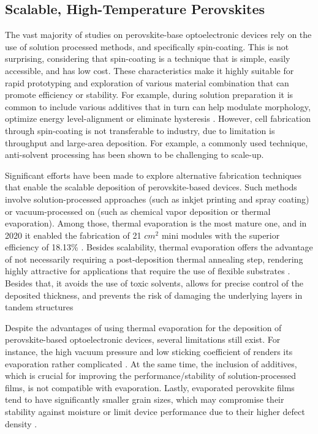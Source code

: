 \subsection{Scalable, High-Temperature Perovskites}

The vast majority of studies on perovskite-base optoelectronic devices rely on the use of solution processed methods, and specifically spin-coating. This is not surprising, considering that spin-coating is a technique that is simple, easily accessible, and has low cost. These characteristics make it highly suitable for rapid prototyping and exploration of various material combination that can promote efficiency or stability. For example, during solution preparation it is common to include various additives that in turn can help modulate morphology, optimize energy level-alignment or eliminate hysteresis \cite{Liu2020ACells}. However, cell fabrication through spin-coating is not transferable to industry, due to limitation is throughput and large-area deposition. For example, a commonly used technique, anti-solvent processing has been shown to be challenging to scale-up\cite{Saki2021Solution-processedCells}.

Significant efforts have been made to explore alternative fabrication techniques that enable the scalable deposition of perovskite-based devices. Such methods involve solution-processed approaches (such as inkjet printing and spray coating) or vacuum-processed on (such as chemical vapor deposition or thermal evaporation). Among those, thermal evaporation is the most mature one, and in 2020 it enabled the fabrication of 21 $cm^2$ mini modules with the superior efficiency of 18.13\% \cite{Vaynzof2020TheProcessing, Li2020HighlyMini-modules}. Besides scalability, thermal evaporation offers the advantage of not necessarily requiring a post-deposition thermal annealing step, rendering highly attractive for applications that require the use of flexible substrates \cite{Becker2019LowExperimentation}. Besides that, it avoids the use of toxic solvents, allows for precise control of the deposited thickness, and prevents the risk of damaging the underlying layers in tandem structures \cite{Zhang2020TowardCells, Forgacs2017EfficientCells}

Despite the advantages of using thermal evaporation for the deposition of perovskite-based optoelectronic devices, several limitations still exist. For instance, the high vacuum pressure and low sticking coefficient of  renders its evaporation rather complicated \cite{Kim2020DepositionCH3NH3PbI3Perovskite}. At the same time, the inclusion of additives, which is crucial for improving the performance/stability of solution-processed films, is not compatible with evaporation. Lastly, evaporated perovskite films tend to have significantly smaller grain sizes, which may compromise their stability against moisture or limit device performance due to their higher defect density \cite{Vaynzof2020TheProcessing, Wang2017Scaling}.


